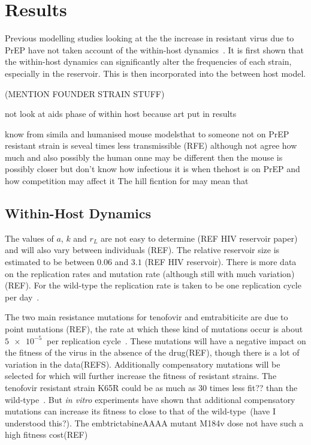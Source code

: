 \documentclass[DIV=15]{scrartcl}
\begin{document}
 \section{Results}
  Previous modelling studies looking at the the increase in resistant virus due to PrEP have not taken account of the within-host dynamics~\cite{abbas2013}. It is first shown that the within-host dynamics can significantly alter the frequencies of each strain, especially in the reservoir. This is then incorporated into the between host model. 
  
  
   (MENTION FOUNDER STRAIN STUFF) 
  
not look  at aids  phase of within host because art put  in results 

know from simila and humanised mouse modelsthat to someone not on PrEP resistant strain is seveal times less transmissible (RFE) although not agree how much and also  possibly the human onne may be different then the mouse is possibly closer but don't know how infectious it is when thehost is on PrEP and how competition may affect it  The hill ficntion for may mean that  


  
  \subsection{Within-Host Dynamics}
  
  The values of $a$, $k$ and $r_L$ are not easy to determine (REF HIV reservoir paper) and will also vary between individuals (REF). The relative reservoir size is estimated to be between $0.06$ and $3.1$ (REF HIV reservoir). There is more data on the replication rates and mutation rate (although still with much variation) (REF). For the wild-type the replication rate is taken to  be one replication cycle  per day~\cite{perelson1996}. 
  
  
The two main resistance mutations for tenofovir and emtrabiticite are due to point mutations (REF), the rate at which these kind of mutations occur is about $\SI{5e-5}{}$ per replication cycle~\cite{gao2004,cuevas2015,abram2010}. These mutations will have a negative impact on the fitness of the virus in the absence of the drug(REF), though there is a lot of variation in the data(REFS). Additionally compensatory mutations will  be selected for which will further increase the fitness of resistant strains. The tenofovir resistant strain K65R could be as much as $30$ times less fit?? than the wild-type~\cite{cong2007}. But \textit{in vitro} experiments have shown that additional compensatory mutations can increase its fitness to close to that of the wild-type~\cite{Svarovskaia2008}(have I understood this?). The embtrictabineAAAA mutant M184v
dose not have such a high fitness cost(REF)
\end{document}
